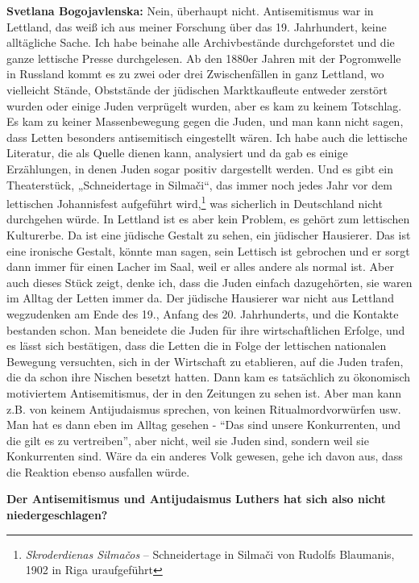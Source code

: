 \textbf{Svetlana Bogojavlenska:} Nein, überhaupt nicht. Antisemitismus war in Lettland, das weiß ich aus meiner Forschung über das 19. Jahrhundert, keine alltägliche Sache. Ich habe beinahe alle Archivbestände durchgeforstet und die ganze lettische Presse durchgelesen. Ab den 1880er Jahren mit der Pogromwelle in Russland kommt es zu zwei oder drei Zwischenfällen in ganz Lettland, wo vielleicht Stände, Obststände der jüdischen Marktkaufleute entweder zerstört wurden oder einige Juden verprügelt wurden, aber es kam zu keinem Totschlag. Es kam zu keiner Massenbewegung gegen die Juden, und man kann nicht sagen, dass Letten besonders antisemitisch eingestellt wären. Ich habe auch die lettische Literatur, die als Quelle dienen kann, analysiert und da gab es einige Erzählungen, in denen Juden sogar positiv dargestellt werden. Und es gibt ein Theaterstück, „Schneidertage in Silmači“, das immer noch jedes Jahr vor dem lettischen Johannisfest aufgeführt wird,\footnote{\textit{Skroderdienas Silmačos} – Schneidertage in Silmači von Rudolfs Blaumanis, 1902 in Riga uraufgeführt} was sicherlich in Deutschland nicht durchgehen würde. In Lettland ist es aber kein Problem, es gehört zum lettischen Kulturerbe. Da ist eine jüdische Gestalt zu sehen, ein jüdischer Hausierer. Das ist eine ironische Gestalt, könnte man sagen, sein Lettisch ist gebrochen und er sorgt dann immer für einen Lacher im Saal, weil er alles andere als normal ist. Aber auch dieses Stück zeigt, denke ich, dass die Juden einfach dazugehörten, sie waren im Alltag der Letten immer da. Der jüdische Hausierer war nicht aus Lettland wegzudenken am Ende des 19., Anfang des 20. Jahrhunderts, und die Kontakte bestanden schon. Man beneidete die Juden für ihre wirtschaftlichen Erfolge, und es lässt sich bestätigen, dass die Letten die in Folge der lettischen nationalen Bewegung versuchten, sich in der Wirtschaft zu etablieren, auf die Juden trafen, die da schon ihre Nischen besetzt hatten. Dann kam es tatsächlich zu ökonomisch motiviertem Antisemitismus, der in den Zeitungen zu sehen ist. Aber man kann z.B. von keinem Antijudaismus sprechen, von keinen Ritualmordvorwürfen usw. Man hat es dann eben im Alltag gesehen - "`Das sind unsere Konkurrenten, und die gilt es zu vertreiben"', aber nicht, weil sie Juden sind, sondern weil sie Konkurrenten sind. Wäre da ein anderes Volk gewesen, gehe ich davon aus, dass die Reaktion ebenso ausfallen würde.

\textbf{Der Antisemitismus und Antijudaismus Luthers hat sich also nicht niedergeschlagen?}

